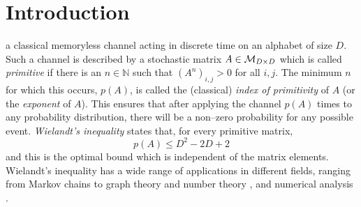 \documentclass[journal,twoside]{IEEEtran}
\newcommand{\1}{\mathbbm{1}}
\renewcommand{\>}{\rangle}
\newcommand{\<}{\langle}
\def\MDD{{\cal M}_{D\times D}}
\def\N{\mathbb N}
\begin{document}
%
\IEEEpeerreviewmaketitle



\section{Introduction}
% 
% 
% 
% 
 a classical memoryless channel acting in discrete time on
an alphabet of size $D$. Such a channel is described by a stochastic
matrix $A\in \MDD$ which is called \emph{primitive} \cite{Horn} if
there is an $n\in \N$ such that $(A^n)_{i,j} > 0$ for all $i,j$. The minimum $n$
for which this occurs, $p(A)$, is called the (classical) \emph{index
of primitivity} of $A$ (or the \emph{exponent} of $A$). This ensures
that after applying the channel $p(A)$ times to any probability
distribution, there will be a non--zero probability for any possible
event. \emph{Wielandt's inequality} \cite{Wielandt} states that, for
every primitive matrix,
\begin{equation*}
p(A)\le D^2 - 2D + 2
\end{equation*}
and this is the optimal bound which is independent of the matrix
elements. Wielandt's
inequality has a wide range of applications in different fields,
ranging from Markov chains \cite{Seneta} to graph theory and number
theory \cite{Frobenius}, and numerical analysis \cite{Varga}.
\end{document}
